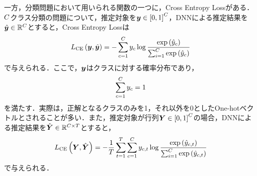 \documentclass[12pt]{jarticle}
\numberwithin{equation}{section}    %
\numberwithin{figure}{section}      %
\numberwithin{table}{section}      %
\begin{document}
一方，分類問題において用いられる関数の一つに，Cross Entropy Lossがある．$C$クラス分類の問題について，推定対象を$\bm{y} \in \left[0, 1\right]^{C}$，DNNによる推定結果を$\hat{\bm{y}} \in \mathbb{R}^{C}$とすると，Cross Entropy Lossは
\begin{equation}
    L_{\text{CE}}\left(\bm{y}, \hat{\bm{y}}\right) = - \sum_{c = 1}^{C} y_{c} \log \frac{\exp\left(\hat{y}_{c}\right)}{\sum_{i = 1}^{C} \exp\left(\hat{y}_{c}\right)}
\end{equation}
で与えられる．ここで，$\bm{y}$はクラスに対する確率分布であり，
\begin{equation}
    \sum_{c = 1}^{C} y_{c} = 1
\end{equation}
を満たす．実際は，正解となるクラスのみを1，それ以外を0としたOne-hotベクトルとされることが多い．また，推定対象が行列$\bm{Y} \in \left[0, 1\right]^{C}$の場合，DNNによる推定結果を$\hat{\bm{Y}} \in \mathbb{R}^{C \times T}$とすると，
\begin{equation}
    L_{\text{CE}}\left(\bm{Y}, \hat{\bm{Y}}\right) = - \frac{1}{T} \sum_{t = 1}^{T} \sum_{c = 1}^{C} y_{c, t} \log \frac{\exp\left(\hat{y}_{c, t}\right)}{\sum_{i = 1}^{C} \exp\left(\hat{y}_{c, t}\right)}
\end{equation}
で与えられる．
\end{document}
